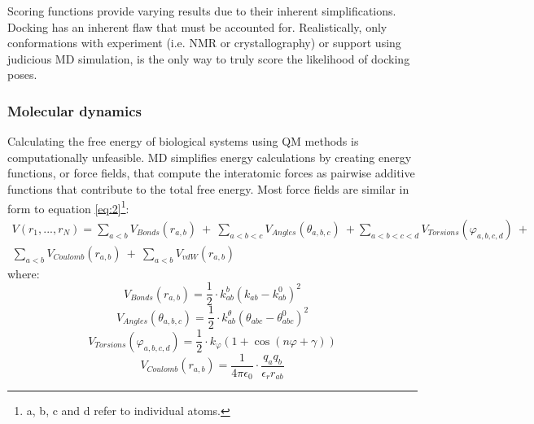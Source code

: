 \documentclass[journal=jctcce,manuscript=article]{achemso}
\begin{document}
{Scoring functions provide varying results due to their inherent simplifications. 
Docking has an inherent flaw that must be accounted for.
Realistically, only conformations with experiment (i.e. NMR or crystallography) or support using judicious \ac{MD} simulation, is the only way to truly score the likelihood of docking poses.\cite{Samsonov2016ComputationalComplexes, Nivedha2016Vina-Carb:Docking, Sankaranarayanan2014TowardProteins}


\subsubsection{Molecular dynamics} \label{MD}

Calculating the free energy of biological systems using \ac{QM} methods is computationally unfeasible.\cite{Dror2012BiomolecularBiology}
\ac{MD} simplifies energy calculations by creating energy functions, or force fields, that 
compute the interatomic forces as pairwise additive functions that contribute to the total free energy.\cite{Dror2012BiomolecularBiology, Woods2010ComputationalComplexes} 
Most force fields are similar in form to equation \ref{eq:2}\footnote{a, b, c and d refer to individual atoms.}:
\begin{equation} \label{eq:2}
\begin{multlined}
V(r_{1}, ..., r_{N}) = \sum_{a<b}V_{Bonds}(r_{a, b})~+~ 
\sum_{a<b<c}V_{Angles}(\theta_{a, b, c})~+ 
\sum_{a<b<c<d}V_{Torsions}(\varphi_{a, b, c, d})~+~
\\
\sum_{a<b}V_{Coulomb}(r_{a, b})~+~\sum_{a<b}V_{vdW}(r_{a, b})
\end{multlined}
\end{equation}
where: 
\begin{equation} \label{eq:3}
V_{Bonds}(r_{a, b}) =  \frac{1}{2} \cdot k^{b}_{ab}(k_{ab}-k^{0}_{ab})^{2}
\end{equation}
\begin{equation} \label{eq:4}
V_{Angles}(\theta_{a, b, c}) = 
\frac{1}{2}  \cdot k^{\theta}_{ab}(\theta_{abc}-\theta^{0}_{abc})^{2}
\end{equation}
\begin{equation} \label{eq:5}
V_{Torsions}(\varphi_{a, b, c, d}) = \frac{1}{2}  \cdot k_{\varphi} (1+\cos(n\varphi+\gamma))
\end{equation}
\begin{equation} \label{eq:6}
V_{Coulomb}(r_{a, b}) = \frac{1}{4\pi \epsilon_{0}} \cdot \frac{q_{a}q_{b}}{\epsilon_{r} r_{ab}}
\end{equation}
}
\end{document}
